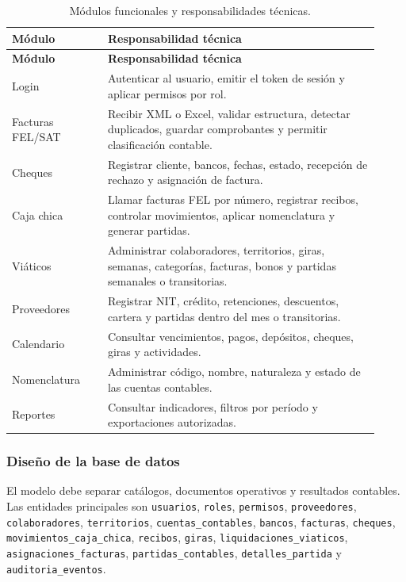 \begin{longtable}{p{0.24\linewidth}p{0.68\linewidth}}
\caption{Módulos funcionales y responsabilidades técnicas.}\label{tab:B_modulos_responsabilidades}\\
\toprule
\textbf{Módulo} & \textbf{Responsabilidad técnica} \\
\midrule
\endfirsthead
\toprule
\textbf{Módulo} & \textbf{Responsabilidad técnica} \\
\midrule
\endhead
\endfoot
\bottomrule
\endlastfoot
Login & Autenticar al usuario, emitir el token de sesión y aplicar permisos por rol. \\
Facturas FEL/SAT & Recibir XML o Excel, validar estructura, detectar duplicados, guardar comprobantes y permitir clasificación contable. \\
Cheques & Registrar cliente, bancos, fechas, estado, recepción de rechazo y asignación de factura. \\
Caja chica & Llamar facturas FEL por número, registrar recibos, controlar movimientos, aplicar nomenclatura y generar partidas. \\
Viáticos & Administrar colaboradores, territorios, giras, semanas, categorías, facturas, bonos y partidas semanales o transitorias. \\
Proveedores & Registrar NIT, crédito, retenciones, descuentos, cartera y partidas dentro del mes o transitorias. \\
Calendario & Consultar vencimientos, pagos, depósitos, cheques, giras y actividades. \\
Nomenclatura & Administrar código, nombre, naturaleza y estado de las cuentas contables. \\
Reportes & Consultar indicadores, filtros por período y exportaciones autorizadas. \\
\end{longtable}

\subsubsection{Diseño de la base de datos}
El modelo debe separar catálogos, documentos operativos y resultados contables. Las entidades principales son \texttt{usuarios}, \texttt{roles}, \texttt{permisos}, \texttt{proveedores}, \texttt{colaboradores}, \texttt{territorios}, \texttt{cuentas\_contables}, \texttt{bancos}, \texttt{facturas}, \texttt{cheques}, \texttt{movimientos\_caja\_chica}, \texttt{recibos}, \texttt{giras}, \texttt{liquidaciones\_viaticos}, \texttt{asignaciones\_facturas}, \texttt{partidas\_contables}, \texttt{detalles\_partida} y \texttt{auditoria\_eventos}.

